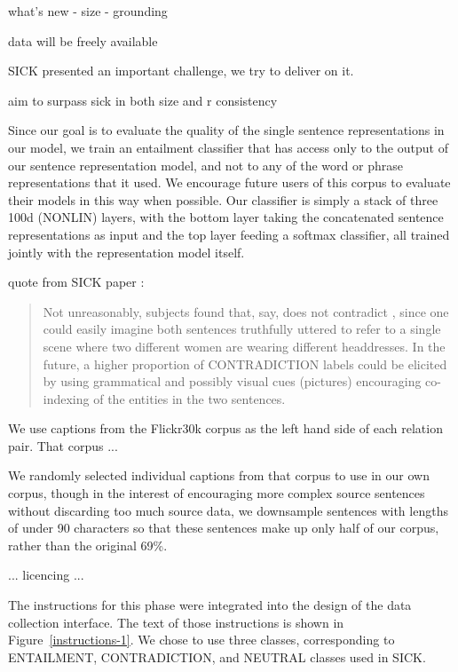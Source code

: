 what's new
- size
- grounding

data will be freely available

SICK presented an important challenge, we try to deliver on it.

aim to surpass sick in both size and r consistency

Since our goal is to evaluate the quality of the single sentence representations in our model, we train an entailment classifier that has access only to the output of our sentence representation model, and not to any of the word or phrase representations that it used. We encourage future users of this corpus to evaluate their models in this way when possible. Our classifier is simply a stack of three 100d (NONLIN) layers, with the bottom layer taking the concatenated sentence representations as input and the top layer feeding a softmax classifier, all trained jointly with the representation model itself.

quote from SICK paper \cite{marelli2014sick}:

\begin{quote}
Not unreasonably, subjects found that, say,  does not contradict , since one could easily imagine both sentences truthfully uttered to refer to a single scene where two different women are wearing different headdresses. In the future, a higher proportion of CONTRADICTION labels could be elicited by using grammatical and possibly visual cues (pictures) encouraging co-indexing of the entities in the two sentences.
\end{quote}

We use captions from the Flickr30k corpus \cite{hodoshimage} as the left hand side of each relation pair. That corpus ...

We randomly selected individual captions from that corpus to use in our own corpus, though in the interest of encouraging more complex source sentences without discarding too much source data, we downsample sentences with lengths of under 90 characters so that these sentences make up only half of our corpus, rather than the original 69\%.

... licencing ...

The instructions for this phase were integrated into the design of the data collection interface. The text of those instructions is shown in Figure~\ref{instructions-1}. We chose to use three classes, corresponding to ENTAILMENT, CONTRADICTION, and NEUTRAL classes used in SICK.


